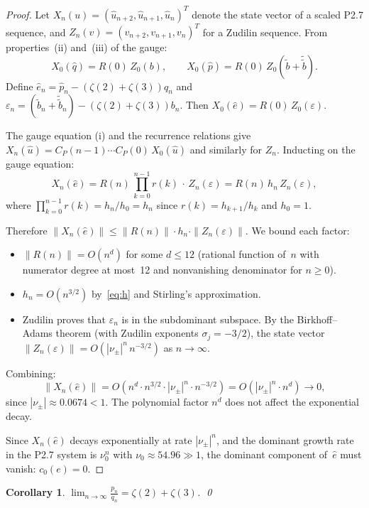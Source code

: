 \documentclass[11pt]{article}
\newtheorem{corollary}[theorem]{Corollary}
\theoremstyle{remark}
\begin{document}
\begin{proof}
Let $X_n(u) = (\hat{u}_{n+2}, \hat{u}_{n+1}, \hat{u}_n)^T$
denote the state vector of a scaled P2.7 sequence, and
$Z_n(v) = (v_{n+2}, v_{n+1}, v_n)^T$ for a Zudilin sequence.
From properties~(ii) and~(iii) of the gauge:
\[
X_0(\hat{q}) = R(0)\,Z_0(b), \qquad
X_0(\hat{p}) = R(0)\,Z_0(\tilde{b}+\tilde{\tilde{b}}).
\]
Define $\hat{e}_n = \hat{p}_n - (\zeta(2)+\zeta(3))\hat{q}_n$
and $\varepsilon_n = (\tilde{b}_n+\tilde{\tilde{b}}_n) -
(\zeta(2)+\zeta(3))b_n$. Then
$X_0(\hat{e}) = R(0)\,Z_0(\varepsilon)$.

The gauge equation (i) and the recurrence relations give
$X_n(\hat{u}) = C_P(n{-}1)\cdots C_P(0)\,X_0(\hat{u})$ and
similarly for $Z_n$. Inducting on the gauge equation:
\[
X_n(\hat{e}) = R(n)\,\prod_{k=0}^{n-1} r(k)\,\cdot\,Z_n(\varepsilon)
= R(n)\,h_n\,Z_n(\varepsilon),
\]
where $\prod_{k=0}^{n-1} r(k) = h_n/h_0 = h_n$ since
$r(k) = h_{k+1}/h_k$ and $h_0 = 1$.

Therefore $\|X_n(\hat{e})\| \le \|R(n)\|\cdot h_n\cdot\|Z_n(\varepsilon)\|$. We bound each factor:
\begin{itemize}
\item $\|R(n)\| = O(n^d)$ for some $d \le 12$
(rational function of~$n$ with numerator degree at most~12
and nonvanishing denominator for $n \ge 0$).
\item $h_n = O(n^{3/2})$ by~\eqref{eq:h} and Stirling's
approximation.
\item Zudilin \cite{Zudilin2004} proves that $\varepsilon_n$
is in the subdominant subspace. By the Birkhoff--Adams theorem
(with Zudilin exponents $\sigma_j = -3/2$), the state vector
$\|Z_n(\varepsilon)\| = O(|\nu_\pm|^n\,n^{-3/2})$
as $n \to \infty$.
\end{itemize}

Combining:
\[
\|X_n(\hat{e})\| = O(n^d \cdot n^{3/2} \cdot |\nu_\pm|^n \cdot n^{-3/2})
= O(|\nu_\pm|^n \cdot n^d) \to 0,
\]
since $|\nu_\pm| \approx 0.0674 < 1$. The polynomial factor
$n^d$ does not affect the exponential decay.

Since $X_n(\hat{e})$ decays exponentially at rate $|\nu_\pm|^n$,
and the dominant growth rate in the P2.7 system is $\nu_0^n$
with $\nu_0 \approx 54.96 \gg 1$, the dominant component
of~$\hat{e}$ must vanish: $c_0(e) = 0$.
\end{proof}

\begin{corollary}
$\displaystyle\lim_{n\to\infty} \frac{p_n}{q_n}
= \zeta(2) + \zeta(3)$. \qed
\end{corollary}
\end{document}
